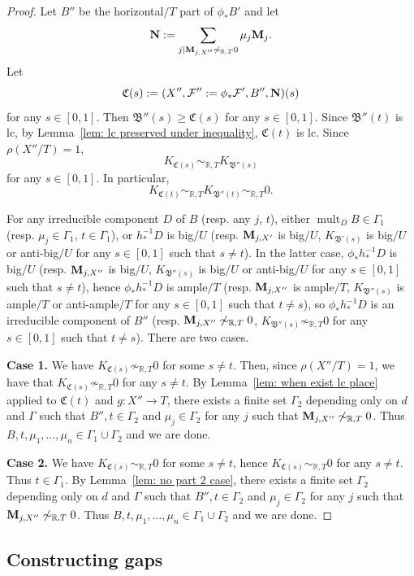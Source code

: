 \documentclass[11pt,reqno]{amsart}
\numberwithin{equation}{section}
\newcommand{\Mm}{{\bf{M}}}
\newcommand{\Nn}{{\bf{N}}}
\newcommand{\Cc}{\mathfrak{C}}
\newcommand{\mult}{\operatorname{mult}}
\newcommand{\Bb}{{\mathfrak{B}}}
\newcommand{\Ff}{\mathcal{F}}
\newcommand{\Ii}{\Gamma}
\theoremstyle{definition}
\begin{document}
\begin{proof}
Let $B''$ be the horizontal$/T$ part of $\phi_*B'$ and let $$\Nn:=\sum_{j\mid \Mm_{j,X''}\not\sim_{\mathbb R,T}0}\mu_j\Mm_j.$$ 
Let
$$\Cc(s):=(X'',\Ff'':=\phi_*\Ff',B'',\Nn)(s)$$
for any $s\in [0,1]$. Then $\Bb''(s)\geq\Cc(s)$ for any $s\in [0,1]$. Since $\Bb''(t)$ is lc, by Lemma~\ref{lem: lc preserved under inequality}, $\Cc(t)$ is lc. Since $\rho(X''/T)=1$,
$$K_{\Cc(s)}\sim_{\mathbb R,T}K_{\Bb''(s)}$$
for any $s\in [0,1]$. In particular, 
$$K_{\Cc(t)}\sim_{\mathbb R,T}K_{\Bb''(t)}\sim_{\mathbb R,T}0.$$

For any irreducible component $D$ of $B$ (resp. any $j$, $t$), either $\mult_DB\in\Ii_1$ (resp. $\mu_j\in\Ii_1$, $t\in\Ii_1$), or $h^{-1}_*D$ is big$/U$ (resp. $\Mm_{j,X'}$ is big$/U$, $K_{\Bb'(s)}$ is big$/U$ or anti-big$/U$ for any $s\in [0,1]$ such that $s\neq t$). In the latter case, $\phi_*h^{-1}_*D$ is big$/U$ (resp. $\Mm_{j,X''}$ is big$/U$, $K_{\Bb''(s)}$ is big$/U$ or anti-big$/U$ for any $s\in [0,1]$ such that $s\neq t$), hence $\phi_*h^{-1}_*D$ is ample$/T$ (resp.  $\Mm_{j,X''}$ is ample$/T$, $K_{\Bb''(s)}$ is ample$/T$ or anti-ample$/T$ for any $s\in [0,1]$ such that $t\neq s$), so $\phi_*h^{-1}_*D$ is an irreducible component of $B''$ (resp. $\Mm_{j,X''}\not\sim_{\mathbb R,T}0$, $K_{\Bb''(s)}\not\sim_{\mathbb R,T}0$ for any $s\in [0,1]$ such that $t\neq s$). There are two cases.

\medskip

\noindent\textbf{Case 1.} We have $K_{\Cc(s)}\not\sim_{\mathbb R,T}0$ for some $s\neq t$. Then, since $\rho(X''/T)=1$, we have that $K_{\Cc(s)}\not\sim_{\mathbb R,T}0$ for any $s\neq t$. By Lemma~\ref{lem: when exist lc place} applied to $\Cc(t)$ and $g: X''\rightarrow T$, there exists a finite set $\Ii_2$ depending only on $d$ and $\Ii$ such that $B'',t\in\Ii_2$ and $\mu_j\in\Ii_2$ for any $j$ such that $\Mm_{j,X''}\not\sim_{\mathbb R,T}0$. Thus $B,t,\mu_1,\dots,\mu_n\in\Ii_1\cup\Ii_2$ and we are done.

\medskip

\noindent\textbf{Case 2.} We have $K_{\Cc(s)}\sim_{\mathbb R,T}0$ for some $s\neq t$, hence $K_{\Cc(s)}\sim_{\mathbb R,T}0$ for any $s\neq t$. Thus $t\in\Ii_1$. By Lemma~\ref{lem: no part 2 case}, there exists a finite set $\Ii_2$ depending only on $d$ and $\Ii$ such that $B'',t\in\Ii_2$ and $\mu_j\in\Ii_2$ for any $j$ such that $\Mm_{j,X''}\not\sim_{\mathbb R,T}0$. Thus $B,t,\mu_1,\dots,\mu_n\in\Ii_1\cup\Ii_2$ and we are done.
\end{proof}


\subsection{Constructing gaps}
\end{document}
